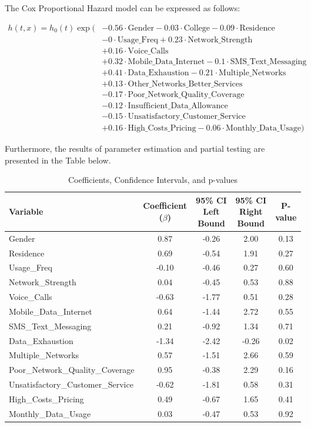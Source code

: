 \documentclass[doublespacing]{report} %
\begin{document}
The Cox Proportional Hazard model can be expressed as follows:


\begin{align*}
h(t,x) = h_0(t) \exp(&-0.56 \cdot \text{Gender} - 0.03 \cdot \text{College} - 0.09 \cdot \text{Residence} \\
&- 0 \cdot \text{Usage\_Freq} + 0.23 \cdot \text{Network\_Strength} \\
&+ 0.16 \cdot \text{Voice\_Calls} \\
&+ 0.32 \cdot \text{Mobile\_Data\_Internet} - 0.1 \cdot \text{SMS\_Text\_Messaging} \\
&+ 0.41 \cdot \text{Data\_Exhaustion} - 0.21 \cdot \text{Multiple\_Networks} \\
&+ 0.13 \cdot \text{Other\_Networks\_Better\_Services} \\
&- 0.17 \cdot \text{Poor\_Network\_Quality\_Coverage} \\
&- 0.12 \cdot \text{Insufficient\_Data\_Allowance} \\
&- 0.15 \cdot \text{Unsatisfactory\_Customer\_Service} \\
&+ 0.16 \cdot \text{High\_Costs\_Pricing} - 0.06 \cdot \text{Monthly\_Data\_Usage})
\end{align*}

 
Furthermore, the results of parameter estimation and partial testing are presented in the Table below.


\begin{table}[H]
\centering
\caption{Coefficients, Confidence Intervals, and p-values}
\begin{tabular}{lcccc}
\hline
Variable & Coefficient ($\beta$) & 95\% CI Left Bound & 95\% CI Right Bound & P-value\\
\hline
Gender & 0.87 & -0.26 & 2.00 & 0.13 \\
Residence & 0.69 & -0.54 & 1.91 & 0.27 \\
Usage\_Freq & -0.10 & -0.46 & 0.27 & 0.60 \\
Network\_Strength & 0.04 & -0.45 & 0.53 & 0.88 \\
Voice\_Calls & -0.63 & -1.77 & 0.51 & 0.28 \\
Mobile\_Data\_Internet & 0.64 & -1.44 & 2.72 & 0.55 \\
SMS\_Text\_Messaging & 0.21 & -0.92 & 1.34 & 0.71 \\
Data\_Exhaustion & -1.34 & -2.42 & -0.26 & 0.02 \\
Multiple\_Networks & 0.57 & -1.51 & 2.66 & 0.59 \\
Poor\_Network\_Quality\_Coverage & 0.95 & -0.38 & 2.29 & 0.16 \\
Unsatisfactory\_Customer\_Service & -0.62 & -1.81 & 0.58 & 0.31 \\
High\_Costs\_Pricing & 0.49 & -0.67 & 1.65 & 0.41 \\
Monthly\_Data\_Usage & 0.03 & -0.47 & 0.53 & 0.92 \\
\hline
\end{tabular}
\label{tab:Cox-ph Coefficeint}
\end{table}
\end{document}
